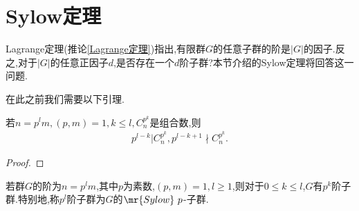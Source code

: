 \section{Sylow定理}
Lagrange定理(推论\ref{Lagrange定理})指出,有限群$G$的任意子群的阶是$|G|$的因子.反之,对于$|G|$的任意正因子$d$,是否存在一个$d$阶子群?本节介绍的Sylow定理将回答这一问题.

在此之前我们需要以下引理.
\begin{lemma}\label{aisuhdjnk}
    若$n=p^lm,(p,m)=1,k\leq l,C_n^{p^k}$是组合数,则\begin{align*}
        p^{l-k}|C_n^{p^k},p^{l-k+1}\nmid C_n^{p^k}.
    \end{align*}
\end{lemma}
\begin{proof}
    \stars
\end{proof}
\begin{theorem}[Sylow第一定理]
    若群$G$的阶为$n=p^lm$,其中$p$为素数,$(p,m)=1,l\geq1$,则对于$0\leq k\leq l$,$G$有$p^k$阶子群.特别地,称$p^l$阶子群为$G$的$\mr{Sylow}\ p$-子群.
\end{theorem}
